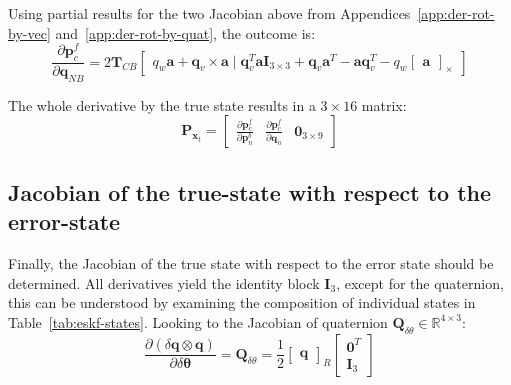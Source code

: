 Using partial results for the two Jacobian above from Appendices~\ref{app:der-rot-by-vec} and~\ref{app:der-rot-by-quat}, the outcome is:
\begin{equation}
    \frac{\partial\mathbf{p}_c^f}{\partial\mathbf{q}_{NB}}=2\mathbf{T}_{CB}\begin{bmatrix}
        q_w\mathbf{a}+\mathbf{q}_v\times\mathbf{a}\; | \;\mathbf{q}_v^T\mathbf{a}\mathbf{I}_{3\times 3}+\mathbf{q}_v\mathbf{a}^T-\mathbf{a}\mathbf{q}_v^T-q_w\begin{bmatrix}
            \mathbf{a}
        \end{bmatrix}_\times
    \end{bmatrix}
\end{equation}

The whole derivative by the true state results in a $3\times 16$ matrix:
\begin{equation}
    \mathbf{P}_{\mathbf{x}_t}=\begin{bmatrix}
     \frac{\partial\mathbf{p}_c^f}{\partial\mathbf{p}_n^b} & \frac{\partial\mathbf{p}_c^f}{\partial\mathbf{q}_n} & \mathbf{0}_{3\times 9}
    \end{bmatrix}
\end{equation}

\subsection*{Jacobian of the true-state with respect to the error-state}

Finally, the Jacobian of the true state with respect to the error state should be determined. All derivatives yield the identity block $\mathbf{I}_3$, except for the quaternion, this can be understood by examining the composition of individual states in Table~\ref{tab:eskf-states}. Looking to the Jacobian of quaternion $\mathbf{Q}_{\delta\theta}\in\mathbb{R}^{4\times 3}$:
\begin{equation}
    \frac{\partial(\delta\mathbf{q}\otimes \mathbf{q})}{\partial\delta\boldsymbol{\theta}} = \mathbf{Q}_{\delta\theta} = \frac{1}{2}\begin{bmatrix}
        \mathbf{q}
    \end{bmatrix}_R
    \begin{bmatrix}
        \mathbf{0}^T \\
        \mathbf{I}_3
    \end{bmatrix} 
\end{equation}

